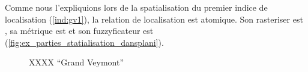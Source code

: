 Comme nous l’expliquions lors de la spatialisation du premier indice
de localisation (\ref{ind:gv1}), la relation de localisation
 est atomique. Son rasteriser est
, sa métrique est  et son
fuzzyficateur est 
(\autoref{fig:ex_parties_statialisation_dansplani}).

\begin{figure}
  \centering
  \hspace{1cm}
  \caption{XXXX \enquote{Grand Veymont}}
\end{figure}

